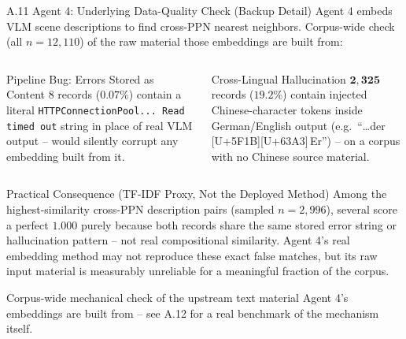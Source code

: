 \documentclass[aspectratio=169,11pt]{beamer}
\begin{document}
\begin{frame}{A.11 Agent 4: Underlying Data-Quality Check (Backup Detail)}
\scriptsize
Agent 4 embeds VLM scene descriptions to find cross-PPN nearest neighbors. Corpus-wide check (all $n=12{,}110$) of the raw material those embeddings are built from:
\begin{columns}[T]
\begin{alertblock}{Pipeline Bug: Errors Stored as Content}
$8$ records ($0.07\%$) contain a literal \texttt{HTTPConnectionPool... Read timed out} string in place of real VLM output -- would silently corrupt any embedding built from it.
\end{alertblock}

\begin{alertblock}{Cross-Lingual Hallucination}
$\mathbf{2{,}325}$ records ($\mathbf{19.2\%}$) contain injected Chinese-character tokens inside German/English output (e.g.\ ``\ldots der\,[U+5F1B][U+63A3]\,Er'') -- on a corpus with no Chinese source material.
\end{alertblock}
\end{columns}
\begin{block}{Practical Consequence (TF-IDF Proxy, Not the Deployed Method)}
Among the highest-similarity cross-PPN description pairs (sampled $n=2{,}996$), several score a perfect $1.000$ purely because both records share the same stored error string or hallucination pattern -- not real compositional similarity. Agent 4's real embedding method may not reproduce these exact false matches, but its raw input material is measurably unreliable for a meaningful fraction of the corpus.
\end{block}
{\tiny\color{PrismGray} Corpus-wide mechanical check of the upstream text material Agent 4's embeddings are built from -- see A.12 for a real benchmark of the mechanism itself.}
\end{frame}
\end{document}
